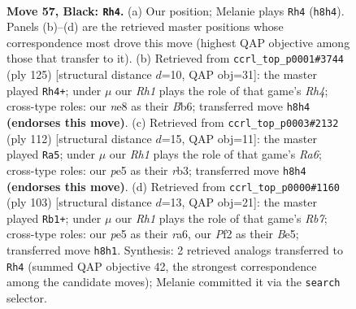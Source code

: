 \documentclass[11pt]{article}
\begin{document}
\clearpage

\begin{figure}[p]\centering
\begin{subfigure}{0.46\textwidth}\centering
\resizebox{\linewidth}{!}{%
\newchessgame
\chessboard[
  setfen={4N2r/Pb3K2/2k5/4P3/8/8/5p2/8 b - - 2 57},
  showmover=false,
  pgfstyle=straightmove, color=movearrow, markmove={h8-h4}
]}
\caption{}
\end{subfigure}\hfill
\begin{subfigure}{0.46\textwidth}\centering
\resizebox{\linewidth}{!}{%
\newchessgame
\chessboard[
  setfen={8/2k5/Pb6/4N2r/4K3/1R6/8/8 b - - 2 63},
  showmover=false,
  pgfstyle=straightmove, color=movearrow, markmove={h5-h4}
]}
\caption{}
\end{subfigure}
\\[4pt]
\begin{subfigure}{0.46\textwidth}\centering
\resizebox{\linewidth}{!}{%
\newchessgame
\chessboard[
  setfen={8/8/R5n1/5pk1/8/1r6/4BK2/8 w - - 5 57},
  showmover=false,
  pgfstyle=straightmove, color=movearrow, markmove={a6-a5}
]}
\caption{}
\end{subfigure}\hfill
\begin{subfigure}{0.46\textwidth}\centering
\resizebox{\linewidth}{!}{%
\newchessgame
\chessboard[
  setfen={8/8/R7/3kb1p1/6P1/5P2/1r2N3/5K2 b - - 17 52},
  showmover=false,
  pgfstyle=straightmove, color=movearrow, markmove={b2-b1}
]}
\caption{}
\end{subfigure}
\caption{\textbf{Move 57, Black: \texttt{Rh4}.} (a) Our position; Melanie plays \texttt{Rh4} (\texttt{h8h4}). Panels (b)--(d) are the retrieved master positions whose correspondence most drove this move (highest QAP objective among those that transfer to it). (b) Retrieved from \texttt{ccrl\_top\_p0001\#3744} (ply 125) [structural distance $d$=10, QAP obj=31]: the master played \texttt{Rh4+}; under $\mu$ our \emph{Rh1} plays the role of that game's \emph{Rh4}; cross-type roles: our \emph{n}e8 as their \emph{B}b6; transferred move \texttt{h8h4} \textbf{(endorses this move)}. (c) Retrieved from \texttt{ccrl\_top\_p0003\#2132} (ply 112) [structural distance $d$=15, QAP obj=11]: the master played \texttt{Ra5}; under $\mu$ our \emph{Rh1} plays the role of that game's \emph{Ra6}; cross-type roles: our \emph{p}e5 as their \emph{r}b3; transferred move \texttt{h8h4} \textbf{(endorses this move)}. (d) Retrieved from \texttt{ccrl\_top\_p0000\#1160} (ply 103) [structural distance $d$=13, QAP obj=21]: the master played \texttt{Rb1+}; under $\mu$ our \emph{Rh1} plays the role of that game's \emph{Rb7}; cross-type roles: our \emph{p}e5 as their \emph{r}a6, our \emph{P}f2 as their \emph{B}e5; transferred move \texttt{h8h1}. Synthesis: 2 retrieved analogs transferred to \texttt{Rh4} (summed QAP objective 42, the strongest correspondence among the candidate moves); Melanie committed it via the \texttt{search} selector.}
\label{fig:thought-m113}
\end{figure}
\end{document}
